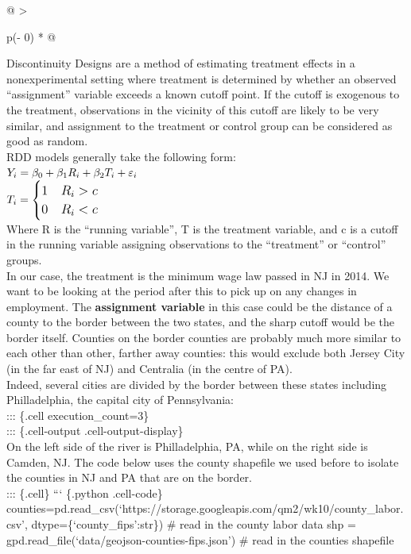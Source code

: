 \documentclass[
  letterpaper,
  DIV=11,
  numbers=noendperiod]{scrreprt}
\begin{document}
\begin{longtable}[]{@{}
  >{\raggedright\arraybackslash}p{}@{}}
{{Discontinuity Designs}} are a method of estimating treatment effects in
a nonexperimental setting where treatment is determined by whether an
observed ``assignment'' variable exceeds a known cutoff point. If the
cutoff is exogenous to the treatment, observations in the vicinity of
this cutoff are likely to be very similar, and assignment to the
treatment or control group can be considered as good as random. \\
RDD models generally take the following form: \\
\(\huge Y_{i} = \beta_0 + \beta_1 R_i + \beta_2 T_i + \varepsilon_{i}\) \\
\(\large T_i=    \begin{cases}
1 & R_i>c\\
0 & R_i<c\\
\end{cases} \) \\
Where R is the ``running variable'', T is the treatment variable, and c
is a cutoff in the running variable assigning observations to the
``treatment'' or ``control'' groups. \\
In our case, the treatment is the minimum wage law passed in NJ in 2014.
We want to be looking at the period after this to pick up on any changes
in employment. The \textbf{assignment variable} in this case could be
the distance of a county to the border between the two states, and the
sharp cutoff would be the border itself. Counties on the border counties
are probably much more similar to each other than other, farther away
counties: this would exclude both Jersey City (in the far east of NJ)
and Centralia (in the centre of PA). \\
Indeed, several cities are divided by the border between these states
including Philladelphia, the capital city of Pennsylvania: \\
::: \{.cell execution\_count=3\} \\
::: \{.cell-output .cell-output-display\} \\
On the left side of the river is Philladelphia, PA, while on the right
side is Camden, NJ. The code below uses the county shapefile we used
before to isolate the counties in NJ and PA that are on the border. \\
::: \{.cell\} ``` \{.python .cell-code\}
counties=pd.read\_csv(`https://storage.googleapis.com/qm2/wk10/county\_labor.csv',
dtype=\{`county\_fips':str\}) \# read in the county labor data shp =
gpd.read\_file(`data/geojson-counties-fips.json') \# read in the
counties shapefile \\

\end{longtable}
\end{document}
